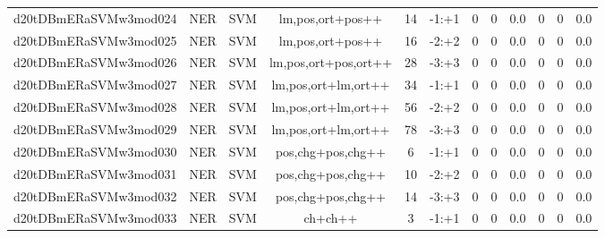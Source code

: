 \documentclass[a4paper]{article}
\begin{document}
\begin{landscape}
\begin{center}
\begin{tabular}{ |c|c|c|c|c|c|c|c|c|c|c|c|}
 
 	
 	\small{ d20tDBmERaSVMw3mod024 } & \small{ NER} & \small{  SVM }  & lm,pos,ort+pos++  &  14 &  \small{  -1:+1 }  &  0 & 0 & 0.0  &  0 & 0 & 0.0 \\
 	

 
 	
 	\small{ d20tDBmERaSVMw3mod025 } & \small{ NER} & \small{  SVM }  & lm,pos,ort+pos++  &  16 &  \small{  -2:+2 }  &  0 & 0 & 0.0  &  0 & 0 & 0.0 \\
 	

 
 	
 	\small{ d20tDBmERaSVMw3mod026 } & \small{ NER} & \small{  SVM }  & lm,pos,ort+pos,ort++  &  28 &  \small{  -3:+3 }  &  0 & 0 & 0.0  &  0 & 0 & 0.0 \\
 	

 
 	
 	\small{ d20tDBmERaSVMw3mod027 } & \small{ NER} & \small{  SVM }  & lm,pos,ort+lm,ort++  &  34 &  \small{  -1:+1 }  &  0 & 0 & 0.0  &  0 & 0 & 0.0 \\
 	

 
 	
 	\small{ d20tDBmERaSVMw3mod028 } & \small{ NER} & \small{  SVM }  & lm,pos,ort+lm,ort++  &  56 &  \small{  -2:+2 }  &  0 & 0 & 0.0  &  0 & 0 & 0.0 \\
 	

 
 	
 	\small{ d20tDBmERaSVMw3mod029 } & \small{ NER} & \small{  SVM }  & lm,pos,ort+lm,ort++  &  78 &  \small{  -3:+3 }  &  0 & 0 & 0.0  &  0 & 0 & 0.0 \\
 	

 
 	
 	\small{ d20tDBmERaSVMw3mod030 } & \small{ NER} & \small{  SVM }  & pos,chg+pos,chg++  &  6 &  \small{  -1:+1 }  &  0 & 0 & 0.0  &  0 & 0 & 0.0 \\
 	

 
 	
 	\small{ d20tDBmERaSVMw3mod031 } & \small{ NER} & \small{  SVM }  & pos,chg+pos,chg++  &  10 &  \small{  -2:+2 }  &  0 & 0 & 0.0  &  0 & 0 & 0.0 \\
 	

 
 	
 	\small{ d20tDBmERaSVMw3mod032 } & \small{ NER} & \small{  SVM }  & pos,chg+pos,chg++  &  14 &  \small{  -3:+3 }  &  0 & 0 & 0.0  &  0 & 0 & 0.0 \\
 	

 
 	
 	\small{ d20tDBmERaSVMw3mod033 } & \small{ NER} & \small{  SVM }  & ch+ch++  &  3 &  \small{  -1:+1 }  &  0 & 0 & 0.0  &  0 & 0 & 0.0 \\
 	


\end{tabular}
\end{center}
\end{landscape}
\end{document}
